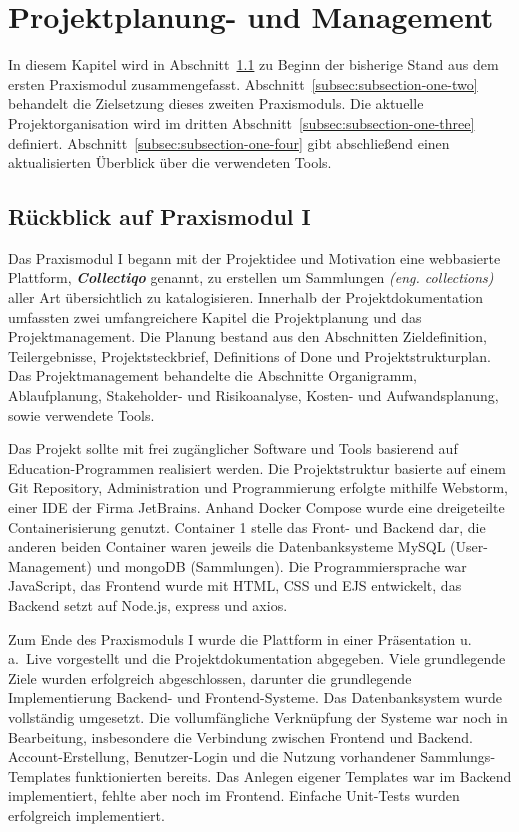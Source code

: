 \section{Projektplanung- und Management}\label{sec:section-one}

In diesem Kapitel wird in Abschnitt~\ref{subsec:subsection-one-one} zu Beginn der bisherige Stand aus dem ersten Praxismodul zusammengefasst.
Abschnitt~\ref{subsec:subsection-one-two} behandelt die Zielsetzung dieses zweiten Praxismoduls.
Die aktuelle Projektorganisation wird im dritten Abschnitt~\ref{subsec:subsection-one-three} definiert.
Abschnitt~\ref{subsec:subsection-one-four} gibt abschließend einen aktualisierten Überblick über die verwendeten Tools.

\subsection{Rückblick auf Praxismodul I}\label{subsec:subsection-one-one}

Das Praxismodul I begann mit der Projektidee und Motivation eine webbasierte Plattform, \textbf{\textit{Collectiqo}} genannt, zu erstellen um Sammlungen \textit{(eng. collections)} aller Art übersichtlich zu katalogisieren.
Innerhalb der Projektdokumentation umfassten zwei umfangreichere Kapitel die Projektplanung und das Projektmanagement.
Die Planung bestand aus den Abschnitten Zieldefinition, Teilergebnisse, Projektsteckbrief, Definitions of Done und Projektstrukturplan.
Das Projektmanagement behandelte die Abschnitte Organigramm, Ablaufplanung, Stakeholder- und Risikoanalyse, Kosten- und Aufwandsplanung, sowie verwendete Tools.

Das Projekt sollte mit frei zugänglicher Software und Tools basierend auf Education-Programmen realisiert werden.
Die Projektstruktur basierte auf einem Git Repository, Administration und Programmierung erfolgte mithilfe Webstorm, einer IDE der Firma JetBrains.
Anhand Docker Compose wurde eine dreigeteilte Containerisierung genutzt.
Container 1 stelle das Front- und Backend dar, die anderen beiden Container waren jeweils die Datenbanksysteme MySQL (User-Management) und mongoDB (Sammlungen).
Die Programmiersprache war JavaScript, das Frontend wurde mit HTML, CSS und EJS entwickelt, das Backend setzt auf Node.js, express und axios.

Zum Ende des Praxismoduls I wurde die Plattform in einer Präsentation u.\,a.\ Live vorgestellt und die Projektdokumentation abgegeben.
Viele grundlegende Ziele wurden erfolgreich abgeschlossen, darunter die grundlegende Implementierung Backend- und Frontend-Systeme.
Das Datenbanksystem wurde vollständig umgesetzt.
Die vollumfängliche Verknüpfung der Systeme war noch in Bearbeitung, insbesondere die Verbindung zwischen Frontend und Backend.
Account-Erstellung, Benutzer-Login und die Nutzung vorhandener Sammlungs-Templates funktionierten bereits.
Das Anlegen eigener Templates war im Backend implementiert, fehlte aber noch im Frontend.
Einfache Unit-Tests wurden erfolgreich implementiert.

